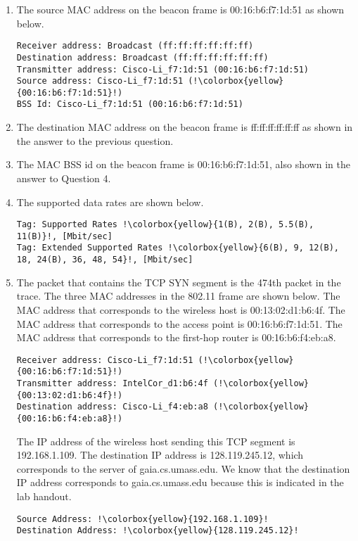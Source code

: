 \documentclass{article}
\begin{document}
\begin{enumerate}
    \item The source MAC address on the beacon frame is 00:16:b6:f7:1d:51 as shown below.
\begin{verbatim}
Receiver address: Broadcast (ff:ff:ff:ff:ff:ff)
Destination address: Broadcast (ff:ff:ff:ff:ff:ff)
Transmitter address: Cisco-Li_f7:1d:51 (00:16:b6:f7:1d:51)
Source address: Cisco-Li_f7:1d:51 (!\colorbox{yellow}{00:16:b6:f7:1d:51}!)
BSS Id: Cisco-Li_f7:1d:51 (00:16:b6:f7:1d:51)
\end{verbatim}

    \item The destination MAC address on the beacon frame is ff:ff:ff:ff:ff:ff as shown in the answer to the previous question.

    \item The MAC BSS id on the beacon frame is 00:16:b6:f7:1d:51, also shown in the answer to Question 4.
    
    \item The supported data rates are shown below.
\begin{verbatim}
Tag: Supported Rates !\colorbox{yellow}{1(B), 2(B), 5.5(B), 11(B)}!, [Mbit/sec]
Tag: Extended Supported Rates !\colorbox{yellow}{6(B), 9, 12(B), 18, 24(B), 36, 48, 54}!, [Mbit/sec]
\end{verbatim}

    \item The packet that contains the TCP SYN segment is the 474th packet in the trace. The three MAC addresses in the 802.11 frame are shown below. The MAC address that corresponds to the wireless host is 00:13:02:d1:b6:4f. The MAC address that corresponds to the access point is 00:16:b6:f7:1d:51. The MAC address that corresponds to the first-hop router is 00:16:b6:f4:eb:a8.
\begin{verbatim}
Receiver address: Cisco-Li_f7:1d:51 (!\colorbox{yellow}{00:16:b6:f7:1d:51}!)
Transmitter address: IntelCor_d1:b6:4f (!\colorbox{yellow}{00:13:02:d1:b6:4f}!)
Destination address: Cisco-Li_f4:eb:a8 (!\colorbox{yellow}{00:16:b6:f4:eb:a8}!)
\end{verbatim}

    The IP address of the wireless host sending this TCP segment is 192.168.1.109. The destination IP address is 128.119.245.12, which corresponds to the server of gaia.cs.umass.edu. We know that the destination IP address corresponds to gaia.cs.umass.edu because this is indicated in the lab handout.
\begin{verbatim}
Source Address: !\colorbox{yellow}{192.168.1.109}!
Destination Address: !\colorbox{yellow}{128.119.245.12}!
\end{verbatim}


\end{enumerate}
\end{document}
